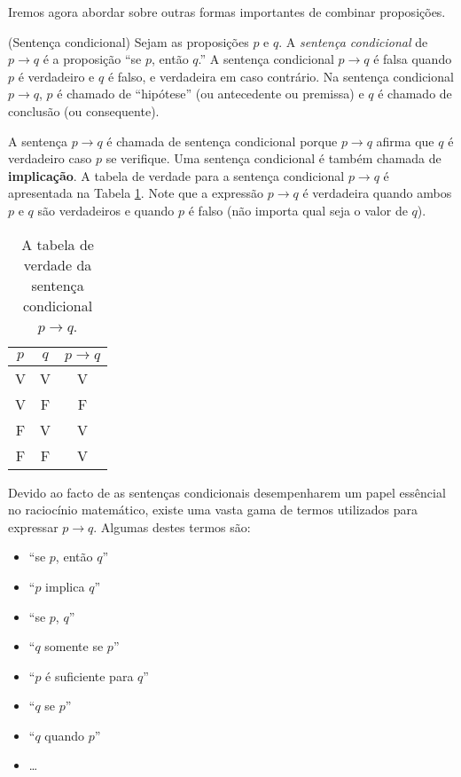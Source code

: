 Iremos agora abordar sobre outras formas importantes de combinar proposições.

\label{def15}
\begin{defn}
(Sentença condicional) Sejam as proposições $p$ e $q$. A \emph{sentença
condicional} de $p \to q$ é a proposição ``se $p$, então $q$.'' A sentença
condicional $p \to q$ é falsa quando $p$ é verdadeiro e $q$ é falso, e
verdadeira em caso contrário. Na sentença condicional $p \to q$, $p$ é chamado
de ``hipótese'' (ou antecedente ou premissa) e $q$ é chamado de conclusão (ou consequente).
\end{defn}

A sentença $p \to q$ é chamada de sentença condicional porque $p \to q$ afirma
que $q$ é verdadeiro caso $p$ se verifique. Uma sentença condicional é também
chamada de \textbf{implicação}. A tabela de verdade para a sentença condicional
$p \to q$ é apresentada na Tabela \ref{tab15}. Note que a expressão $p \to
q$ é verdadeira quando ambos $p$ e $q$ são verdadeiros e quando $p$ é falso
(não importa qual seja o valor de $q$).

\begin{table}[H]
\centering
\begin{tabular}{|c|c|c|}%
\toprule
\textbf{$p$} & \textbf{$q$} & \textbf{$p \to q$}\\ 
\midrule
V &	V & V\\
V &	F & F\\
F &	V & V\\
F &	F & V\\
\bottomrule%
\end{tabular}%
\caption{A tabela de verdade da sentença condicional $p \to q$.}
\label{tab15}
\end{table}


Devido ao facto de as sentenças condicionais desempenharem um papel
essêncial no raciocínio matemático, existe uma vasta gama de termos utilizados
para expressar $p \to q$. Algumas destes termos são:

\begin{itemize}
  \item ``se $p$, então $q$''
  \item ``$p$ implica $q$''
  \item ``se $p$, $q$''
  \item ``$q$ somente se $p$''
  \item ``$p$ é suficiente para $q$''
  \item ``$q$ se $p$''
  \item ``$q$ quando $p$''
  \item \ldots
\end{itemize}


